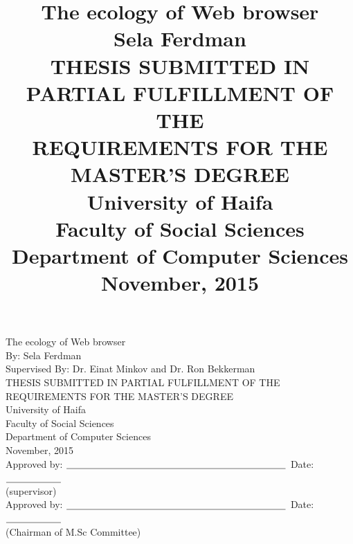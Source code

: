 \documentclass[11pt,oneside]{book}
\newcommand{\bigspace}{\mbox{\hspace{10mm}}}
\begin{document}
\title{\Huge{The ecology of Web browser}
                \huge
             \\[10mm] Sela Ferdman
             \\[25mm] \Large THESIS SUBMITTED IN PARTIAL FULFILLMENT OF THE
             \\       REQUIREMENTS FOR THE MASTER'S DEGREE
             \\[15mm] University of Haifa
             \\       Faculty of Social Sciences
             \\       Department of Computer Sciences
             \\[10mm] November, 2015
}
\author{}
\date{}
\maketitle{}

\pagestyle{plain}

\begin{center}
\Huge
     The ecology of Web browser
\huge
\\[10mm] By: Sela Ferdman
\\[3mm] Supervised By: Dr. Einat Minkov and Dr. Ron Bekkerman
\Large
\\ [10mm]THESIS SUBMITTED IN PARTIAL FULFILLMENT OF THE
\\ REQUIREMENTS FOR THE MASTER'S DEGREE
\\ [10mm]University of Haifa
\\ [1mm]Faculty of Social Sciences
\\ [1mm]Department of Computer Sciences
\\ [3mm]November, 2015
\\ [8mm] Approved by:
$\underline{\bigspace\bigspace\bigspace\bigspace\bigspace\bigspace\bigspace\bigspace}$
   \bigspace    Date:$\underline{\bigspace\bigspace}$
\\ (supervisor)\bigspace
\\ [3mm]Approved by:
$\underline{\bigspace\bigspace\bigspace\bigspace\bigspace\bigspace\bigspace\bigspace}$
   \bigspace    Date:$\underline{\bigspace\bigspace}$
\\ (Chairman of  M.Sc Committee) \bigspace

\end{center}

\end{document}
